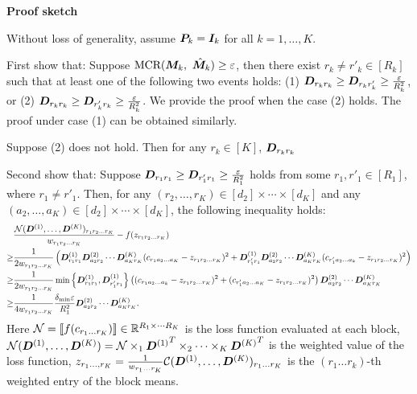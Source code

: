 \documentclass[11pt]{article}
\theoremstyle{plain}
\theoremstyle{definition}
\begin{document}
\begin{center}
{\bf \large Proof sketch}
\end{center}

Without loss of generality, assume $\bm{P}_k=\bm I_k$ for all $k=1,\ldots,K$. 
 

First show that: Suppose $\text{MCR}(\bm M_k,\ \hat {\bm M}_k)\geq \varepsilon$, then there exist $r_k\neq r'_k\in [R_k]$ such that at least one of the following two events holds: (1) $\bm{D}_{r_kr_k} \geq \bm{D}_{r_kr'_k} \geq {\varepsilon \over R_k^2}$, or (2) $\bm{D}_{r_kr_k} \geq \bm{D}_{r'_kr_k} \geq {\varepsilon \over R_k^2}$. We provide the proof when the case (2) holds. The proof under case (1) can be obtained similarly. 

Suppose (2) does not hold. Then for any $r_k\in[K]$, $\bm{D}_{r_kr_k}$

Second show that: Suppose $\bm{D}_{r_1r_1} \geq \bm{D}_{r'_1r_1} \geq {\varepsilon \over R_1^2}$ holds from some $r_1,  r'_1\in[R_1]$, where $r_1\neq r'_1$. Then, for any $(r_2,\ldots,r_K)\in[d_2]\times \cdots \times [d_K]$ and any $(a_2,\ldots,a_K)\in[d_2]\times \cdots \times [d_K]$, the following inequality holds:
\begin{align}\label{eq:3}
&{ \mathcal{N} (\bm{D}^{(1)}, \ldots, \bm{D}^{(K)})_{r_1 r_2\ldots r_K}\over w_{r_1r_2\ldots r_K}} -f (z_{r_1r_2 \ldots r_K})\nonumber \\
\geq & {1\over 2w_{r_1r_2\ldots r_K}} \left( \bm{D}^{(1)}_{r_1r_1}\bm{D}^{(2)}_{a_2r_2}\cdots  \bm{D}^{(K)}_{a_Kr_K}(c_{r_1a_2\ldots a_K} -z_{r_1r_2\ldots r_K})^2+  \bm{D}^{(1)}_{r'_1r_1}\bm{D}^{(2)}_{a_2r_2}\cdots \bm{D}^{(K)}_{a_Kr_K}(c_{r'_1a_2\ldots a_k} -z_{r_1r_2\ldots r_K})^2\right) \nonumber\\
\geq &{1\over 2w_{r_1r_2\ldots r_K}} \min\left\{\bm{D}^{(1)}_{r_1r_1}, \bm{D}^{(1)}_{r'_1r_1}\right\}   \left ( (c_{r_1a_2\ldots a_k} -z_{r_1r_2\ldots r_K})^2+(c_{r'_1a_2\ldots a_K} -z_{r_1r_2\ldots r_K})^2  \right)\bm{D}^{(2)}_{a_2r_2}\cdots \bm{D}^{(K)}_{a_Kr_K} \nonumber\\
\geq & {1\over 4w_{r_1r_2\ldots r_K}}{\delta_{\min}\varepsilon \over R_1^2} \bm{D}^{(2)}_{a_2r_2}\cdots \bm{D}^{(K)}_{a_Kr_K}.
\end{align}
Here $\mathcal{N}=\llbracket f(c_{r_1 \ldots r_K}) \rrbracket\in\mathbb{R}^{R_1\times \cdots R_K}$ is the loss function evaluated at each block, $\mathcal{N} (\bm{D}^{(1)}, \ldots, \bm{D}^{(K)})=\mathcal{N}\times_1 {\bm{D}^{(1)}}^T\times_2\cdots\times_K {\bm{D}^{(K)}}^T$ is the weighted value of the loss function, $z_{r_1\ldots,r_K}={1\over w_{r_1\ldots r_K}}\mathcal{C}(\bm{D}^{(1)},\ldots,\bm{D}^{(K)})_{r_1\ldots r_K}$ is the $(r_1\ldots r_k)$-th weighted entry of the block means.
\end{document}
